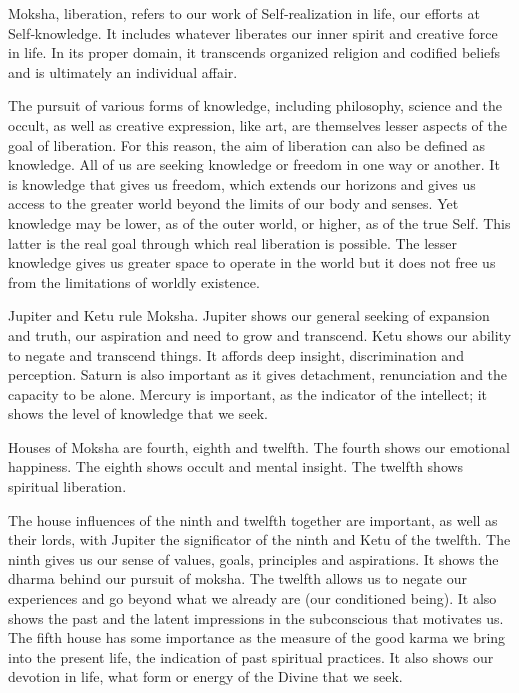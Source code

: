  

Moksha, liberation, refers to our work of Self‑realization in life, our efforts at Self‑knowledge. It includes whatever liberates our inner spirit and creative force in life. In its proper domain, it transcends organized religion and codified beliefs and is ultimately an individual affair.

 

The pursuit of various forms of knowledge, including philosophy, science and the occult, as well as creative expression, like art, are themselves lesser aspects of the goal of liberation. For this reason, the aim of liberation can also be defined as knowledge. All of us are seeking knowledge or freedom in one way or another. It is knowledge that gives us freedom, which extends our horizons and gives us access to the greater world beyond the limits of our body and senses. Yet knowledge may be lower, as of the outer world, or higher, as of the true Self. This latter is the real goal through which real liberation is possible. The lesser knowledge gives us greater space to operate in the world but it does not free us from the limitations of worldly existence.

 

 


 

Jupiter and Ketu rule Moksha. Jupiter shows our general seeking of expansion and truth, our aspiration and need to grow and transcend. Ketu shows our ability to negate and transcend things. It affords deep insight, discrimination and perception. Saturn is also important as it gives detachment, renunciation and the capacity to be alone. Mercury is important, as the indicator of the intellect; it shows the level of knowledge that we seek.

 

Houses of Moksha are fourth, eighth and twelfth. The fourth shows our emotional happiness. The eighth shows occult and mental insight. The twelfth shows spiritual liberation.

 

The house influences of the ninth and twelfth together are important, as well as their lords, with Jupiter the significator of the ninth and Ketu of the twelfth. The ninth gives us our sense of values, goals, principles and aspirations. It shows the dharma behind our pursuit of moksha. The twelfth allows us to negate our experiences and go beyond what we already are (our conditioned being). It also shows the past and the latent impressions in the subconscious that motivates us. The fifth house has some importance as the measure of the good karma we bring into the present life, the indication of past spiritual practices. It also shows our devotion in life, what form or energy of the Divine that we seek.

